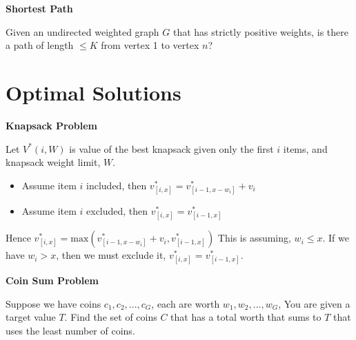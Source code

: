 

\frmrule




\textbf{Shortest Path} 

Given an undirected weighted graph $G$ that has strictly positive weights, 
is there a path of length $\leqslant K$ from vertex 1 to vertex $n$?

\frmrule




\section{Optimal Solutions}



\textbf{Knapsack Problem}

Let $V^{*}(i,W)$ is value of the best knapsack 
given only the first $i$ items, and knapsack weight limit, $W$. 
\begin{itemize}  
\renewcommand{\labelitemi}{$\Box$}  
\item Assume item $i$ included, then $v^{*}_{[i,x]} = v^{*}_{[i-1,x-w_i]} + v_i$
\item Assume item $i$ excluded, then $v^{*}_{[i,x]} = v^{*}_{[i-1,x]}$
\end{itemize} 
Hence $v^{*}_{[i,x]} = \text{max}(v^{*}_{[i-1,x-w_i]} + v_i, v^{*}_{[i-1,x]})$
This is assuming, $w_i \leqslant x$. If we have $w_i > x$, then 
we must exclude it, $v^{*}_{[i,x]} = v^{*}_{[i-1,x]}$.





\textbf{Coin Sum Problem}

Suppose we have coins $c_1, c_2, ..., c_G$, each are worth $w_1, w_2, ..., w_G$, 
You are given a target value $T$. Find the set of coins $C$ that has a 
total worth that sums to $T$ that uses the least number of coins. 


